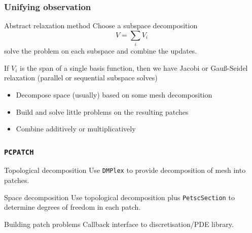 \documentclass[presentation,aspectratio=43,10pt]{beamer}
\begin{document}
\begin{frame}
  \frametitle{Unifying observation}

  \begin{block}{Abstract relaxation method}
    Choose a subspace decomposition
    \begin{equation*}
      V = \sum_i V_i
    \end{equation*}
    solve the problem on each subspace and combine the updates.
  \end{block}
  \begin{example}
    If $V_i$ is the span of a single basis function, then we have
    Jacobi or Gau\ss-Seidel relaxation (parallel or sequential
    subspace solves)
  \end{example}
  \begin{itemize}
  \item Decompose space (usually) based on some mesh decomposition
  \item Build and solve little problems on the resulting patches
  \item Combine additively or multiplicatively
  \end{itemize}
\end{frame}

\begin{frame}
  \frametitle{\texttt{PCPATCH}}
  \begin{block}{Topological decomposition}
    Use \texttt{DMPlex} to provide decomposition of mesh into patches.
  \end{block}

  \begin{block}{Space decomposition}
    Use topological decomposition plus \texttt{PetscSection} to
    determine degrees of freedom in each patch.
  \end{block}

  \begin{block}{Building patch problems}
    Callback interface to discretisation/PDE library.
  \end{block}
\end{frame}
\end{document}
